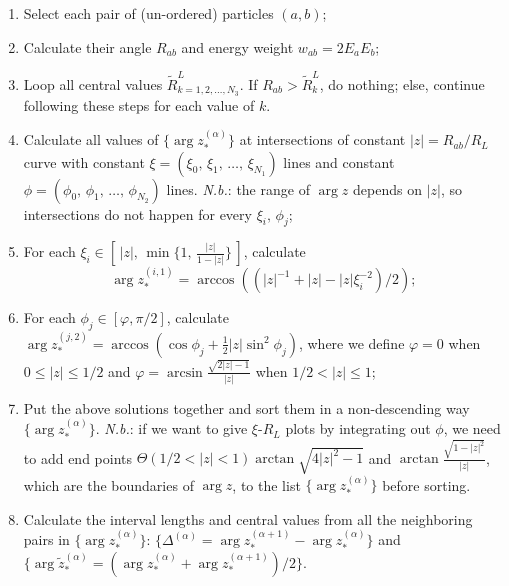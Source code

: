\documentclass[letterpaper,11pt]{article}
\begin{document}
\begin{enumerate}
\begin{itemize}
	\begin{enumerate}

    \item Select each pair of (un-ordered) particles \((a,b)\);

    \item Calculate their angle \(R_{ab}\) and energy weight
    \(w_{ab} = 2 E_a E_b\);

    \item Loop all central values
    \(\widetilde{R}^L_{k=1,2,\dots,N_3}\). If
    \(R_{ab} > \widetilde{R}^L_k\), do nothing; else, continue following these steps for each value of $k$.
  
     \item Calculate all values of \(\{\arg z_*^{(\alpha)}\}\)
    at intersections of constant \(|z|=R_{ab}/R_L\) curve with constant
    \(\xi=(\xi_0,\, \xi_1,\, \dots ,\, \xi_{N_1})\) lines and constant
    \(\phi=(\phi_0,\, \phi_1,\, \dots ,\, \phi_{N_2})\) lines. \emph{N.b.}: the range of \(\arg z\) depends on \(|z|\), so
    intersections do not happen for every \(\xi_i,\,\phi_j\);

    \item For each
    \(\xi_i\in \left[\,|z|,\,\min\{1,\,\frac{|z|}{1-|z|}\}\,\right]\),
    calculate
    \[\arg z^{(i,1)}_* = \arccos\left((|z|^{-1} +|z| -|z|\xi_i^{-2})/2\right);\]

    \item For each
    \(\phi_j\in \left[\varphi, \pi/2\right]\), calculate
    \(\arg z^{(j,2)}_* = \arccos(\cos \phi_j + \frac{1}{2}|z| \sin^2 \phi_{j})\),
    where we define \(\varphi=0\) when \(0\leq|z|\leq 1/2\) and
    \(\varphi=\arcsin \frac{\sqrt{2|z|-1}}{|z|}\) when
    \(1/2 <|z|\leq 1\);

    \item Put the above solutions together and sort them in
    a non-descending way \(\{\arg z_*^{(\alpha)}\}\).
    \emph{N.b.}: if we want to give \(\xi\text{-}R_L\) plots by
    integrating out \(\phi\), we need to add end points
    \(\Theta(1/2<|z|<1) \arctan\sqrt{4|z|^2-1}\) and
    \(\arctan \frac{\sqrt{1-|z|^2}}{|z|} \), which are the boundaries of
    \(\arg z\), to the list \(\{\arg z_*^{(\alpha)}\}\) before sorting.

    \item Calculate the interval lengths and central values
    from all the neighboring pairs in \(\{\arg z_*^{(\alpha)}\}\):
    \(\{\Delta^{(\alpha)}=\arg z_*^{(\alpha+1)}-\arg z_*^{(\alpha)}\}\)
    and
    \(\{\arg \widetilde{z}_*^{(\alpha)}=(\arg z_*^{(\alpha)}+\arg z_*^{(\alpha+1)})/2 \}\).


\end{enumerate}
\end{itemize}
\end{enumerate}
\end{document}
